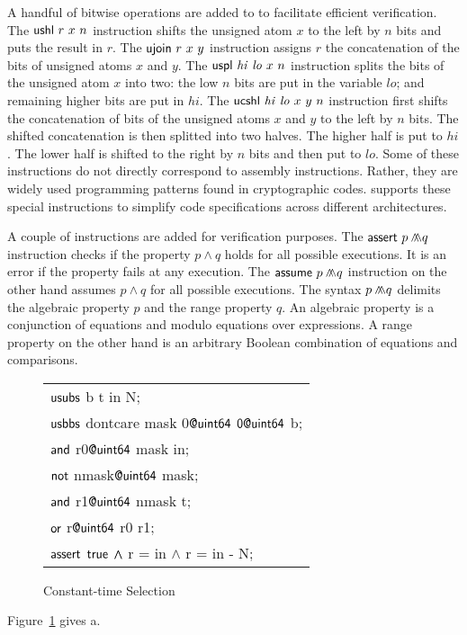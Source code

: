 A handful of bitwise operations are added to \cryptoline to facilitate
efficient verification. The ${\textsf{{ushl}}}\ r\ x\ n$ instruction shifts the
unsigned atom $x$ to the left by $n$ bits and puts the result in
$r$. The ${\textsf{{ujoin}}}\ r\ x\ y$ instruction assigns $r$ the concatenation
of the bits of unsigned atoms $x$ and $y$. The ${\textsf{{uspl}}}\
\mathit{hi}\ \mathit{lo}\ x\ n$ instruction splits the bits of the
unsigned atom $x$ into two: the low $n$ bits are put in the variable
$\mathit{lo}$; and remaining higher bits are put in $\mathit{hi}$.
The $\clUCShl\ \mathit{hi}\ \mathit{lo}\ x\ y\ n$ instruction first
shifts the concatenation of bits of the unsigned atoms $x$ and $y$ to
the left by $n$ bits. The shifted concatenation is then splitted into
two halves. The higher half is put to $\mathit{hi}$. The lower half is
shifted to the right by $n$ bits and then put to $\mathit{lo}$. Some
of these instructions do not directly correspond to assembly
instructions. Rather, they are widely used programming patterns found
in cryptographic codes. \cryptoline supports these special
instructions to simplify code specifications across different
architectures.

A couple of \cryptoline instructions are added for verification
purposes. The ${\textsf{{assert}}}\ p \wedge\!\!\!\!\wedge q$ instruction checks if the
property $p \wedge q$ holds for all possible executions. It is an
error if the property fails at any execution. The ${\textsf{{assume}}}\ p
\wedge\!\!\!\!\wedge q$ instruction on the other hand assumes $p \wedge q$ for all
possible executions. The syntax $p \wedge\!\!\!\!\wedge q$ delimits the algebraic
property $p$ and the range property $q$. An algebraic property is a
conjunction of equations and modulo equations over expressions. A
range property on the other hand is an arbitrary Boolean combination
of equations and comparisons.


\begin{figure}
  \centering
  \begin{tabular}{l}
    ${\textsf{{usubs}}}$ b t in N;\\
    ${\textsf{{usbbs}}}$ dontcare mask 0${\textsf{{@uint64}}}$ ${\textsf{{0@uint64}}}$ b;\\
    ${\textsf{{and}}}$ r0${\textsf{{@uint64}}}$ mask in;\\
    ${\textsf{{not}}}$ nmask${\textsf{{@uint64}}}$ mask;\\
    ${\textsf{{and}}}$ r1${\textsf{{@uint64}}}$ nmask t;\\
    ${\textsf{{or}}}$ r${\textsf{{@uint64}}}$ r0 r1;\\
    ${\textsf{{assert}}}$ ${\textsf{{true}}}$ $\wedge\!\!\!\!\wedge$ r = in $\wedge$ r = in - N;
  \end{tabular}
  \caption{Constant-time Selection}
  \label{figure:cryptoline-example}
\end{figure}

Figure~\ref{figure:cryptoline-example} gives a.


